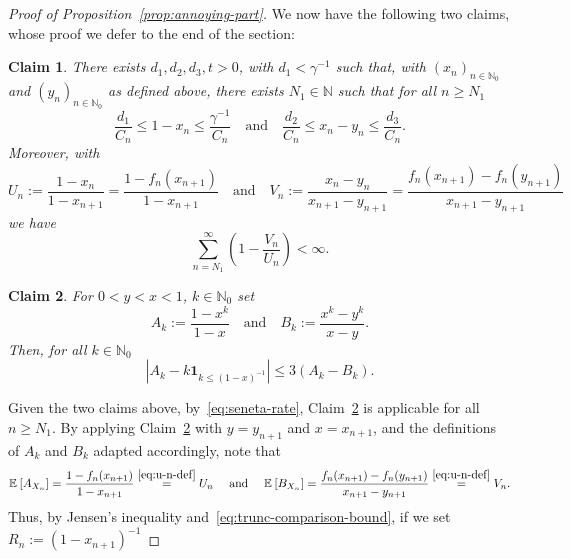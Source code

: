 \documentclass[12pt]{article}
\newtheorem{clm}{Claim}[thm]
\theoremstyle{definition}
\newcommand{\E}[2][]{\ensuremath{\mathbb{E}_{#1}\left[#2 \right]}}
\begin{document}
\begin{proof}[Proof of Proposition~\ref{prop:annoying-part}]
We now have the following two claims, whose proof we defer to the end of the section:
\begin{clm} \label{clm:x-n-y-n}
    There exists $d_1, d_2, d_3, t > 0$, with $d_1 < \gamma^{-1}$ such that, with $(x_{n})_{n \in \mathbb{N}_0}$ and $(y_{n})_{n \in \mathbb{N}_0}$ as defined above, there exists $N_1 \in \mathbb{N}$ such that for all $n \geq N_1$
    \begin{equation} \label{eq:seneta-rate}
        \frac{d_1}{C_{n}} \leq 1 - x_n \leq \frac{\gamma^{-1}}{C_n} \quad \text{and} \quad \frac{d_2}{C_{n}} \leq x_n - y_n \leq \frac{d_3}{C_n}. 
    \end{equation}
    Moreover, with 
    \begin{equation} \label{eq:u-n-def}
    U_n := \frac{1-x_n}{1-x_{n+1}} = \frac{1 - f_{n}(x_{n+1})}{1 - x_{n+1}}\quad \text{and} \quad V_{n} := \frac{x_{n} - y_{n}}{x_{n+1} - y_{n+1}} = \frac{f_{n}(x_{n+1}) - f_{n}(y_{n+1})}{x_{n+1} - y_{n+1}}
    \end{equation} we have 
    \begin{equation} \label{eq:v-over-u-product-conv}
        \sum_{n=N_{1}}^{\infty} \left(1 - \frac{V_{n}}{U_{n}} \right) < \infty.  
    \end{equation}
\end{clm}
\begin{clm} \label{clm:a-k-b-k}
    For  $0 < y < x < 1$, $k \in \mathbb{N}_0$ set \[A_{k} := \frac{1-x^{k}}{1-x} \quad \text{and} \quad B_{k} := \frac{x^{k} - y^{k}}{x-y}.\] Then, for all $k \in \mathbb{N}_0$ 
    \begin{equation} \label{eq:trunc-comparison-bound}
        \left|A_{k} - k \mathbf{1}_{k \leq (1-x)^{-1}} \right| \leq 3 (A_{k} - B_{k}). 
    \end{equation}
\end{clm}
Given the two claims above, by~\eqref{eq:seneta-rate}, Claim~\ref{clm:a-k-b-k} is applicable for all $n \geq N_1$. By applying Claim~\ref{clm:a-k-b-k} with $y = y_{n+1}$ and $x = x_{n+1}$, and the definitions of $A_{k}$ and $B_{k}$ adapted accordingly, note that
\begin{equation} \label{eq:adapting-a-k-b-k-to-exp}
\E{A_{X_{n}}} = \frac{1 - f_{n}(x_{n+1}) }{1 - x_{n+1}} \stackrel{\eqref{eq:u-n-def}}{=} U_{n} \quad \text{ and } \quad \E{B_{X_{n}}} = \frac{f_{n}(x_{n+1}) - f_{n}(y_{n+1}) }{x_{n+1} - y_{n+1}} \stackrel{\eqref{eq:u-n-def}}{=} V_{n}. 
\end{equation}
Thus, by Jensen's inequality and~\eqref{eq:trunc-comparison-bound}, if we set $R_{n} := (1-x_{n+1})^{-1}$ 

\end{proof}
\end{document}
